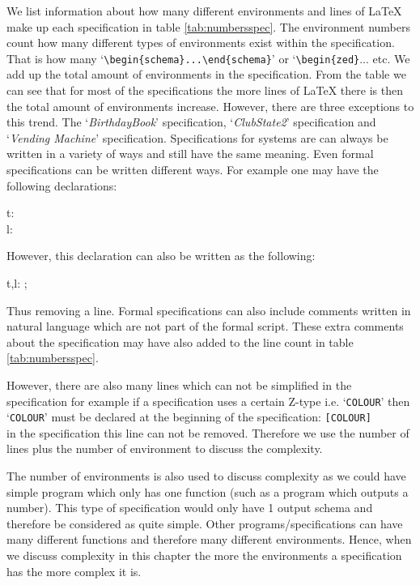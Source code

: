 We list information about how many different environments and lines of \LaTeX{}
make up each specification in table \ref{tab:numbersspec}. The environment
numbers count how many different types of environments exist within the
specification. That is how many `\verb|\begin{schema}...\end{schema}|' or
`\verb|\begin{zed}|... etc. We add up the total amount of environments in the
specification. From the table we can see that for most of the specifications the
more lines of \LaTeX{} there is then the total amount of environments increase.
However, there are three exceptions to this trend. The `\emph{BirthdayBook}'
specification, `\emph{ClubState2}' specification and `\emph{Vending Machine}'
specification. Specifications for systems are can always be written in a variety
of ways and still have the same meaning. Even formal specifications can be
written different ways. For example one may have the following declarations:

\begin{zed}
t:\nat \\
l: \nat 
\end{zed}

However, this declaration can also be written as the following:
\begin{zed}
t,l: ;\nat
\end{zed}

Thus removing a line. Formal specifications can also include comments written in
natural language which are not part of the formal script. These extra comments
about the specification may have also added to the line count in table
\ref{tab:numbersspec}.

However, there are also many lines which can not be simplified in the specification
for example if a specification uses a certain Z-type i.e. `\texttt{COLOUR}' then
`\texttt{COLOUR}' must be declared at the beginning of the specification:
\verb|[COLOUR]|\\
in the specification this line can not be removed. Therefore
we use the number of lines plus the number of environment to discuss the complexity.

The number of environments is also used to discuss complexity as we could have simple
program which only has one function (such as a program which outputs a number). This 
type of specification would only have 1 output schema and therefore be considered as 
quite simple. Other programs/specifications can have many different functions and 
therefore many different environments. Hence, when we discuss complexity in this chapter
the more the environments a specification has the more complex it is.

